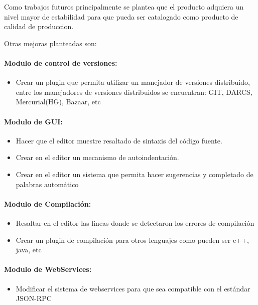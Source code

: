 Como trabajos futuros principalmente se plantea que el producto adquiera un nivel mayor de estabilidad para que pueda ser catalogado como producto de calidad de produccion.

Otras mejoras planteadas son:

\paragraph{Modulo de control de versiones:}

\begin{itemize}
	\item Crear un plugin que permita utilizar un manejador de versiones distribuido, entre los manejadores de versiones distribuidos se encuentran: GIT, DARCS, Mercurial(HG), Bazaar, etc
\end{itemize}

\paragraph{Modulo de GUI:}

\begin{itemize}
	\item Hacer que el editor muestre resaltado de sintaxis del código fuente.
	\item Crear en el editor un mecanismo de autoindentación.
	\item Crear en el editor un sistema que permita hacer sugerencias y completado de palabras automático
\end{itemize}

\paragraph{Modulo de Compilación:}

\begin{itemize}
	\item Resaltar en el editor las lineas donde se detectaron los errores de compilación
	\item Crear un plugin de compilación para otros lenguajes como pueden ser c++, java, etc
\end{itemize}

\paragraph{Modulo de WebServices:}

\begin{itemize}
	\item Modificar el sistema de webservices para que sea compatible con el estándar JSON-RPC \cite{json-rpc}
\end{itemize}

